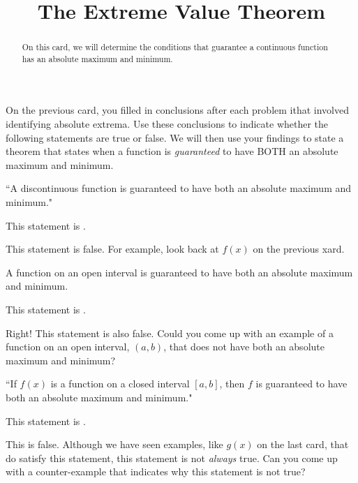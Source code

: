 \documentclass{ximera}
\title[Dig-In:]{The Extreme Value Theorem}
\begin{document}
\begin{abstract}
On this card, we will determine the conditions that guarantee a continuous function has an absolute maximum and minimum. 
\end{abstract}
\maketitle

On the previous card, you filled in conclusions after each problem ithat involved identifying absolute extrema.  Use these conclusions to indicate whether the following statements are true or false.  We will then use your findings to state a theorem that states when a function is \textit{guaranteed} to have BOTH an absolute maximum and minimum.  

\begin{exercise}
\begin{center} ``A discontinuous function is guaranteed to have both an absolute maximum and minimum." \end{center}

This statement is .

\begin{feedback}[correct]
This statement is false.  For example, look back at $f(x)$ on the previous xard.
\end{feedback}
\end{exercise}

\begin{exercise}
\begin{center} A function on an open interval is guaranteed to have both an absolute maximum and minimum. \end{center}

This statement is .

\begin{feedback}[correct]
Right!  This statement is also false. Could you come up with an example of a function on an open interval, $(a,b)$, that does not have both an absolute maximum and minimum?
\end{feedback}
\end{exercise}

\begin{exercise}
\begin{center} ``If $f(x)$ is a function on a closed interval $[a,b]$, then $f$ is guaranteed to have both an absolute maximum and minimum." \end{center}

This statement is .

\begin{feedback}[correct]
This is false.  Although we have seen examples, like $g(x)$ on the last card, that do satisfy this statement, this statement is not \textit{always} true.  Can you come up with a counter-example that indicates why this statement is not true?
\end{feedback}
\end{exercise}
\end{document}
